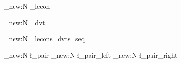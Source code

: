 
\usepackage{tocloft}

\ExplSyntaxOn
\makeatletter

\str_new:N \g_lecon%

\newcommand{\lec}[2]{%
	\str_set:Nn \g_lecon {#1}%
	\section{#1\ - #2~(\nbdvts{#1}/2)}%
	\label{lec:#1}%
}%

\newcommand\lecref[1]{\nameref{lec:#1}}

\str_new:N \g_dvt%

\newcommand{\dvt}[2]{%
	\str_set:Nn \g_dvt {#1}%
	\section{#2}%
	\label{dvt:#1}%
}%

\newcommand\dvtref[1]{\nameref{dvt:#1}}

\seq_new:N \g_lecons_dvts_seq%

\newcommand{\DeclarerLecon}[1]{
	\seq_if_exist:cF {g_lecon#1_dvts_seq} {%
		\seq_new:c {g_lecon#1_dvts_seq}%
		\seq_gput_right:Nn \g_lecons_dvts_seq {#1}%
	}
}

\newcommand{\lierLeconDvt}[3]{%
	\DeclarerLecon{#1}
	\seq_gput_right:cx {g_lecon#1_dvts_seq}{#2,#3}%
}%

\newcommand{\vadans}[2][ok]{
	\lierLeconDvt{#2}{\g_dvt}{#1}
	\item[\smiley{#1}] \nameref{lec:#2}
}

\newcommand{\getlecon}{
	\g_lecon
}

\seq_new:N \l_pair
\tl_new:N \l_pair_left
\tl_new:N \l_pair_right

\newcommand{\nbdvts}[1]{
	\seq_if_exist:NTF \g_lecons_dvts_seq_stored {%
		\seq_count:c {g_lecon#1_dvts_seq_stored}
	} { RECOMPILE }
}

\newcommand{\ListerDvts}[1]{
	\subsection{Développements}
	\seq_if_exist:NTF \g_lecons_dvts_seq_stored {%
		\int_case:nnF { \seq_count:c {g_lecon#1_dvts_seq_stored} } {
			{ 0 } { Aucun. }
		} {%
			\begin{itemize}
			\seq_map_inline:cn {g_lecon#1_dvts_seq_stored} {%
				\seq_set_split:Nnn \l_pair {,} {##1}%
				\seq_pop:NN \l_pair \l_pair_left
				\seq_pop:NN \l_pair \l_pair_right
				\item[\smiley{\l_pair_right}] \nameref{dvt:\l_pair_left}%
			}%
			\end{itemize}
		}
	} { RECOMPILE }
}


